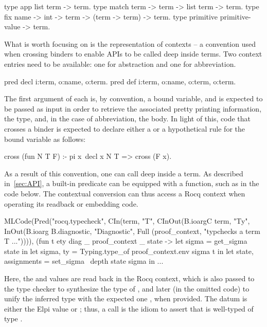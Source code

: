 \documentclass[a4paper, 11pt]{book}
\begin{document}
\begin{elpicode}
type app       list term -> term.                     
type match     term -> term -> list term -> term.   
type fix       name -> int -> term -> (term -> term) -> term.
type primitive primitive-value -> term.
\end{elpicode}

What is worth focusing on is the representation of contexts -- a convention used
when crossing binders to enable APIs to be called deep inside terms. Two
context entries need to be available: one for abstraction and one for
abbreviation.

\begin{elpicode}
pred decl i:term, o:name, o:term.                 %
pred def  i:term, o:name, o:term, o:term.         %
\end{elpicode}

The first argument of each is, by convention, a bound variable, and is
expected to be passed as input in order to retrieve the associated pretty
printing information, the type, and, in the case of abbreviation, the body. In
light of this, code that crosses a binder is expected to declare either a
 or a  hypothetical rule for the bound variable as
follows:

\begin{elpicode}
cross (fun N T F) :- pi x\ decl x N T => cross (F x).
\end{elpicode}


As a result of this convention, one can call  deep inside
a term. As described in~\cref{sec:API}, a built-in predicate can be equipped with a
 function, such as  in the code
below. The  contextual conversion can thus access a Rocq context
when operating its readback or embedding code.

\begin{ocamlcode}
MLCode(Pred("rocq.typecheck",
  CIn(term, "T",
  CInOut(B.ioargC term, "Ty",
  InOut(B.ioarg B.diagnostic, "Diagnostic",
  Full (proof_context, "typchecks a term T ...")))),
    (fun t ety diag _ proof_context _ state ->
      let sigma = get_sigma state in
      let sigma, ty = Typing.type_of proof_context.env sigma t in
      let state, assignments = set_sigma ~depth state sigma in
      ...
\end{ocamlcode}


Here, the  and  values are read back in the
 Rocq context, which is also passed to the type
checker to synthesize the type of , and later (in the omitted code)
to unify the inferred type with the expected one , when provided.
The  datum is either the Elpi value  or
; thus, a call  is the
idiom to assert that  is well-typed of type .
\end{document}
